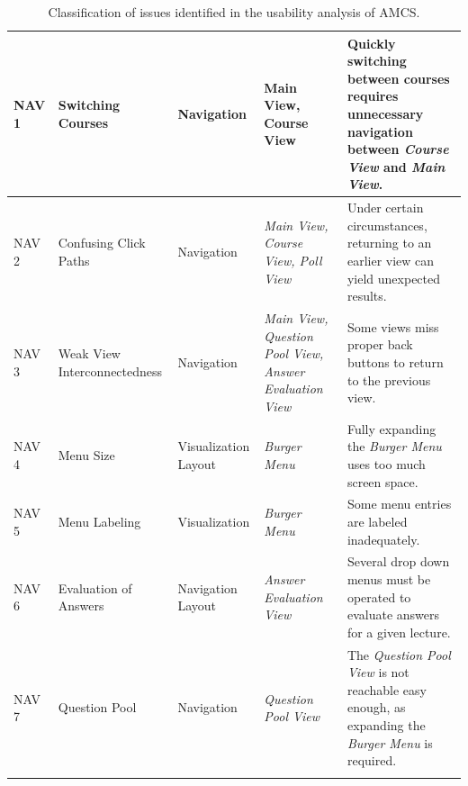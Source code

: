 \begin{longtable}{ | p{1.1cm} | p{2cm} | p{2cm} | p{2.5cm} | p{5.5cm} |}
NAV 1 & Switching Courses & Navigation & Main View, \newline Course View & Quickly switching between courses requires unnecessary navigation between \emph{Course View} and \emph{Main View}. \\ \hline	
NAV 2 & Confusing Click Paths & Navigation & \emph{Main View, \newline Course View, \newline Poll View} & Under certain circumstances, returning to an earlier view can yield unexpected results. \\ \hline
NAV 3 & Weak View Interconnectedness & Navigation & \emph{Main View, \newline Question Pool View, \newline Answer Evaluation View} & Some views miss proper back buttons to return to the previous view. \\ \hline
NAV 4 & Menu Size & Visualization \newline Layout & \emph{Burger Menu} & Fully expanding the \emph{Burger Menu} uses too much screen space. \\ \hline
NAV 5 & Menu Labeling & Visualization & \emph{Burger Menu} & Some menu entries are labeled inadequately. \\ \hline			
NAV 6 & Evaluation of Answers & Navigation \newline Layout & \emph{Answer Evaluation View} & Several drop down menus must be operated to evaluate answers for a given lecture. \\ \hline	
NAV 7 & Question Pool & Navigation & \emph{Question Pool View} & The \emph{Question Pool View} is not reachable easy enough, as expanding the \emph{Burger Menu} is required. \\ \hline									

\caption{Classification of issues identified in the usability analysis of AMCS.}
\label{tab:problems2}
\end{longtable}

